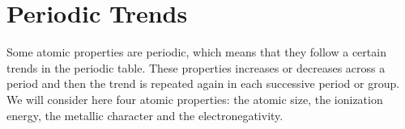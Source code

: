 \documentclass[main.tex]{subfiles}
\begin{document}
\begin{description}
%
%





\end{description}

\section{Periodic Trends}
Some atomic properties are periodic, which means that they follow a certain trends in the periodic table. These properties increases or decreases across a period and then the trend is repeated again in each successive period or group. We will consider here four atomic properties: the atomic size, the ionization energy, the metallic character and the electronegativity.
\end{document}
